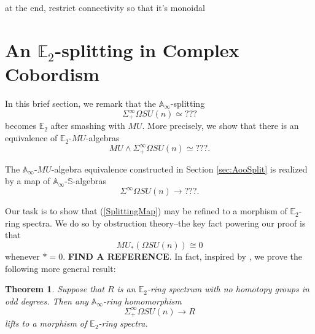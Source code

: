 \documentclass[reqno, oneside]{amsart}
\theoremstyle{definition}
\theoremstyle{plain}
\newtheorem{thm}[nul]{Theorem}
\DeclareMathOperator{\smsh}{\wedge}
\begin{document}
at the end, restrict connectivity so that it's monoidal

\section{An \texorpdfstring{$\mathbb{E}_2$}{E2}-splitting in Complex Cobordism} \label{sec:MUE2}

In this brief section, we remark that the $\mathbb{A}_\infty$-splitting $$\Sigma^{\infty}_+ \Omega SU(n) \simeq ???$$ becomes $\mathbb{E}_2$ after smashing with $MU$.  More precisely, we show that there is an equivalence of $\mathbb{E}_2$-$MU$-algebras
$$MU \smsh \Sigma^{\infty}_+ \Omega SU(n) \simeq ???.$$

The $\mathbb{A}_\infty$-$MU$-algebra equivalence constructed in Section \ref{sec:AooSplit} is realized by a map of $\mathbb{A}_\infty$-$\mathbb{S}$-algebras
\begin{equation} \label{SplittingMap}
\Sigma^{\infty} \Omega SU(n) \longrightarrow ???.
\end{equation}

Our task is to show that (\ref{SplittingMap}) may be refined to a morphism of $\mathbb{E}_2$-ring spectra.  We do so by obstruction theory--the key fact powering our proof is that 
$$MU_*\left(\Omega SU(n)\right) \cong 0$$
whenever $*=0$.  \textbf{FIND A REFERENCE}.  In fact, inspired by \cite{ChadwickMandell}, we prove the following more general result:

\begin{thm}
Suppose that $R$ is an $\mathbb{E}_2$-ring spectrum with no homotopy groups in odd degrees.  Then any $\mathbb{A}_\infty$-ring homomorphism
$$\Sigma^{\infty}_+ \Omega SU(n) \rightarrow R$$
lifts to a morphism of $\mathbb{E}_2$-ring spectra.
\end{thm}
\end{document}
